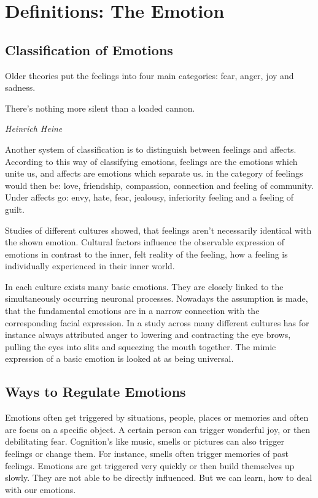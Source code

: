 \documentclass[../Book.Stress_regulation.tex]{subfiles}
\begin{document}
\chapter{Definitions: The Emotion}
\section{Classification of Emotions}

Older theories put the feelings into four main categories: fear, anger, joy and sadness.

\epigraph{There's nothing more silent than a loaded cannon.}{\textit{Heinrich Heine}}

Another system of classification is to distinguish between feelings and affects.
According to this way of classifying emotions, feelings are the emotions which unite us, and affects are emotions which separate us.
in the category of feelings would then be: love, friendship, compassion, connection and feeling of community.
Under affects go: envy, hate, fear, jealousy, inferiority feeling and a feeling of guilt.

Studies of different cultures showed, that feelings aren't necessarily identical with the shown emotion.
Cultural factors influence the observable expression of emotions in contrast to the inner, felt reality of the feeling,
how a feeling is individually experienced in their inner world.

In each culture exists many basic emotions.
They are closely linked to the simultaneously occurring neuronal processes.
Nowadays the assumption is made, that the fundamental emotions are in a narrow connection with the corresponding facial expression.
In a study across many different cultures has for instance always attributed anger to lowering and contracting the eye brows,
pulling the eyes into slits and squeezing the mouth together.
The mimic expression of a basic emotion is looked at as being universal.

\section{Ways to Regulate Emotions}

Emotions often get triggered by situations, people, places or memories and often are focus on a specific object.
A certain person can trigger wonderful joy, or then debilitating fear.
Cognition's like music, smells or pictures can also trigger feelings or change them.
For instance, smells often trigger memories of past feelings.
Emotions are get triggered very quickly or then build themselves up slowly.
They are not able to be directly influenced.
But we can learn, how to deal with our emotions.
\end{document}
